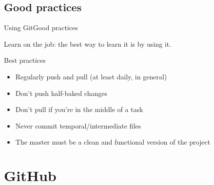 \documentclass[10pt,compress]{beamer} %
\begin{document}
\subsection{Good practices}
\begin{frame}{Using Git}{Good practices}


Learn on the job: the best way to learn it is by using it. 

\bigskip

Best practices
\begin{itemize}
  \item Regularly push and pull (at least daily, in general)
  \item Don't push half-baked changes 
  \item Don't pull if you're in the middle of a task
  \item Never commit temporal/intermediate files
  \item The master must be a clean and functional version of the project
\end{itemize}

\end{frame}


\section{GitHub}
\end{document}
